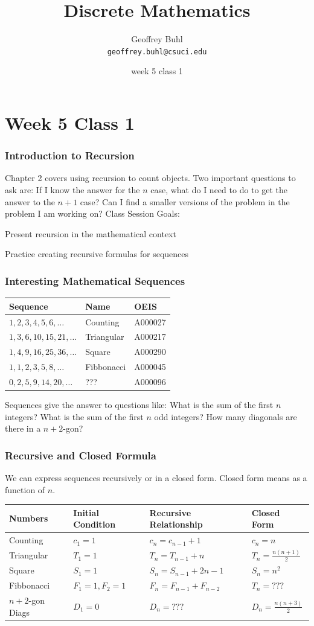 \documentclass{beamer}
\title{Discrete Mathematics}
\author[Geoffrey Buhl]{Geoffrey Buhl \\ \texttt{geoffrey.buhl@csuci.edu}}
\institute[CSUCI]{California State University Channel Islands}
\date{week 5 class 1}
\newenvironment{packed_enum}{
\begin{enumerate}
  \setlength{\itemsep}{1pt}
  \setlength{\parskip}{0pt}
  \setlength{\parsep}{0pt}
}{\end{enumerate}}
\begin{document}


\section{Week 5 Class 1}

\frame
{
  \frametitle{Introduction to Recursion}

Chapter 2 covers using recursion to count objects.  Two important questions to ask are:  If I know the answer for the $n$ case, what do I need to do to get the answer to the $n+1$ case?  Can I find a smaller versions of the problem in the problem I am working on?
\vfill
Class Session Goals:
\begin{packed_enum}
\item Present recursion in the mathematical context
\item Practice creating recursive formulas for sequences
\end{packed_enum}
\vfill
}

\frame
{
  \frametitle{Interesting Mathematical Sequences}


\begin{tabular}{lll}
Sequence & Name & OEIS\\ \hline
$1,2,3,4,5,6, \ldots$ &Counting & A000027 \\
$1,3,6,10,15,21, \ldots$ &Triangular & A000217\\
$1,4,9,16,25,36, \ldots$ &Square &A000290 \\
$1,1,2,3,5,8, \ldots$ &Fibbonacci &A000045 \\
$0, 2, 5, 9, 14, 20, \ldots$ &???&A000096\\
\end{tabular}
\vfill
Sequences give the answer to questions like: What is the sum of the first $n$ integers?  What is the sum of the first $n$ odd integers? How many diagonals are there in a $n+2$-gon?

}


\frame
{
  \frametitle{Recursive and Closed Formula}

We can express sequences recursively or in a closed form.  Closed form means as a function of $n$.\vfill

\begin{tabular}{llll}
Numbers & Initial Condition & Recursive Relationship & Closed Form \\ \hline
Counting & $c_1=1$ & $c_n=c_{n-1}+1$ & $c_n=n$\\
Triangular & $T_1=1$ & $T_n=T_{n-1}+n$ & $T_n=\frac{n(n+1)}{2}$\\
Square& $S_1=1$ & $S_n=S_{n-1}+2n-1$ & $S_n=n^2$\\
Fibbonacci& $F_1=1,F_2=1$ & $F_n=F_{n-1}+F_{n-2}$ & $T_n=???$\\
$n+2$-gon Diags& $D_1=0$ & $D_n=???$ & $D_n=\frac{n(n+3)}{2}$
\end{tabular}
\vfill

}
\end{document}
